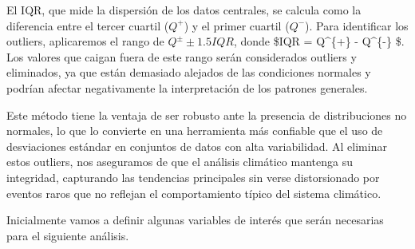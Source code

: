 \documentclass[11pt]{article}
\begin{document}
El IQR, que mide la dispersión de los datos centrales, se calcula como
la diferencia entre el tercer cuartil (\(Q^+\)) y el primer cuartil
(\(Q^-\)). Para identificar los outliers, aplicaremos el rango de
\(Q^{\pm} \pm 1.5IQR\), donde \$IQR = Q\^{}\{+\} - Q\^{}\{-\} \$. Los
valores que caigan fuera de este rango serán considerados outliers y
eliminados, ya que están demasiado alejados de las condiciones normales
y podrían afectar negativamente la interpretación de los patrones
generales.

Este método tiene la ventaja de ser robusto ante la presencia de
distribuciones no normales, lo que lo convierte en una herramienta más
confiable que el uso de desviaciones estándar en conjuntos de datos con
alta variabilidad. Al eliminar estos outliers, nos aseguramos de que el
análisis climático mantenga su integridad, capturando las tendencias
principales sin verse distorsionado por eventos raros que no reflejan el
comportamiento típico del sistema climático.

    Inicialmente vamos a definir algunas variables de interés que serán
necesarias para el siguiente análisis.
\end{document}
